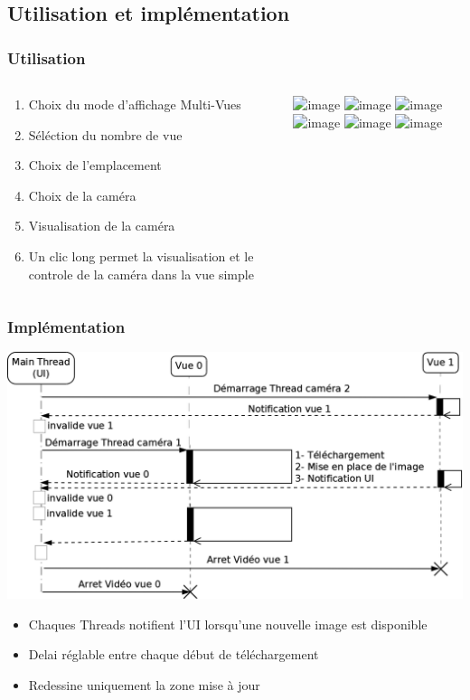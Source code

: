   \subsection{Utilisation et implémentation}
  \begin{frame}
   \frametitle{Utilisation}

\begin{columns}
\begin{column}{7cm}
\begin{enumerate}[<+->]
    \item Choix du mode d'affichage Multi-Vues
    \item Séléction du nombre de vue
  	\item Choix de l'emplacement
  	\item Choix de la caméra
  	\item Visualisation de la caméra
  	\item Un clic long permet la visualisation et le controle de la caméra dans
  	la vue simple
\end{enumerate}
\end{column}
\begin{column}{6cm}
  \centering \includegraphics<1>[width=3cm]{Images/mvstep/s1.jpg}
  \centering \includegraphics<2>[width=3cm]{Images/mvstep/s2.jpg}
  \centering\includegraphics<3>[width=5cm]{Images/mvstep/s3.jpg}
  \centering \includegraphics<4>[width=5cm]{Images/mvstep/s4.jpg}
  \centering \includegraphics<5>[width=5cm]{Images/mvstep/s5.jpg}
  \centering \includegraphics<6>[width=5cm]{Images/mvstep/s6.jpg}
\end{column}
\end{columns}

  \end{frame}
 
  \begin{frame}
   \frametitle{Implémentation}
\centering \includegraphics[scale=0.2]{Images/DiagrammeSequenceMultiView.png}

\begin{itemize}
    \item Chaques Threads notifient l'UI lorsqu'une nouvelle image est
    disponible
  	\item Delai réglable entre chaque début de téléchargement
  	\item Redessine uniquement la zone mise à jour
\end{itemize}
 \end{frame}
  
